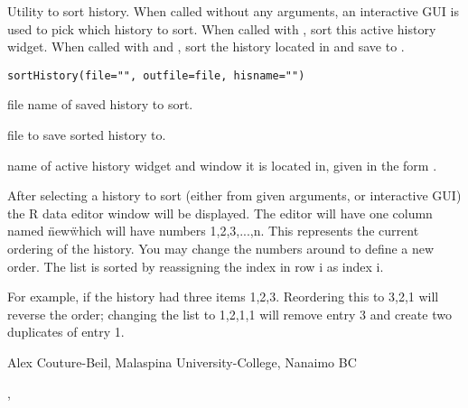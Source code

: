 \documentclass[letterpaper]{book}
\begin{document}
\begin{Description}\relax
Utility to sort history. When called without any arguments, an interactive GUI
is used to pick which history to sort. When called with , sort
this active history widget. When called with  and ,
sort the history located in  and save to .
\end{Description}
\begin{Usage}
\begin{verbatim}
sortHistory(file="", outfile=file, hisname="")
\end{verbatim}
\end{Usage}
\begin{Arguments}
\begin{ldescription}
\item[\code{file}] file name of saved history to sort.
\item[\code{outfile}] file to save sorted history to.
\item[\code{hisname}] name of active history widget and window it is located in, given
in the form .
\end{ldescription}
\end{Arguments}
\begin{Details}\relax
After selecting a history to sort (either from given arguments, or interactive GUI)
the R data editor window will be displayed. The editor will have one column named
\"new\" which will have numbers 1,2,3,...,n. This represents the current ordering
of the history. You may change the numbers around to define a new order. The list
is sorted by reassigning the index in row i as index i.

For example, if the history had three items 1,2,3. Reordering this to 3,2,1 will
reverse the order; changing the list to 1,2,1,1 will remove entry 3 and 
create two duplicates of entry 1.
\end{Details}
\begin{Author}\relax
Alex Couture-Beil, Malaspina University-College, Nanaimo BC
\end{Author}
\begin{SeeAlso}\relax
{}, 
\end{SeeAlso}
\end{document}
